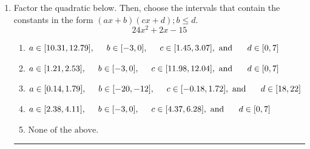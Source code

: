 \documentclass[14pt]{extbook}
\newcommand{\litem}[1]{\item#1\hspace*{-1cm}\rule{\textwidth}{0.4pt}}
\begin{document}
\begin{enumerate}
{\begin{enumerate}[label=\Alph*.]
\end{enumerate} }
\litem{
Factor the quadratic below. Then, choose the intervals that contain the constants in the form $(ax+b)(cx+d); b \leq d.$\[ 24x^{2} +2 x -15 \]\begin{enumerate}[label=\Alph*.]
\item \( a \in [10.31, 12.79], \hspace*{5mm} b \in [-3, 0], \hspace*{5mm} c \in [1.45, 3.07], \text{ and } \hspace*{5mm} d \in [0, 7] \)
\item \( a \in [1.21, 2.53], \hspace*{5mm} b \in [-3, 0], \hspace*{5mm} c \in [11.98, 12.04], \text{ and } \hspace*{5mm} d \in [0, 7] \)
\item \( a \in [0.14, 1.79], \hspace*{5mm} b \in [-20, -12], \hspace*{5mm} c \in [-0.18, 1.72], \text{ and } \hspace*{5mm} d \in [18, 22] \)
\item \( a \in [2.38, 4.11], \hspace*{5mm} b \in [-3, 0], \hspace*{5mm} c \in [4.37, 6.28], \text{ and } \hspace*{5mm} d \in [0, 7] \)
\item \( \text{None of the above.} \)


\end{enumerate}}
\end{enumerate}
\end{document}

